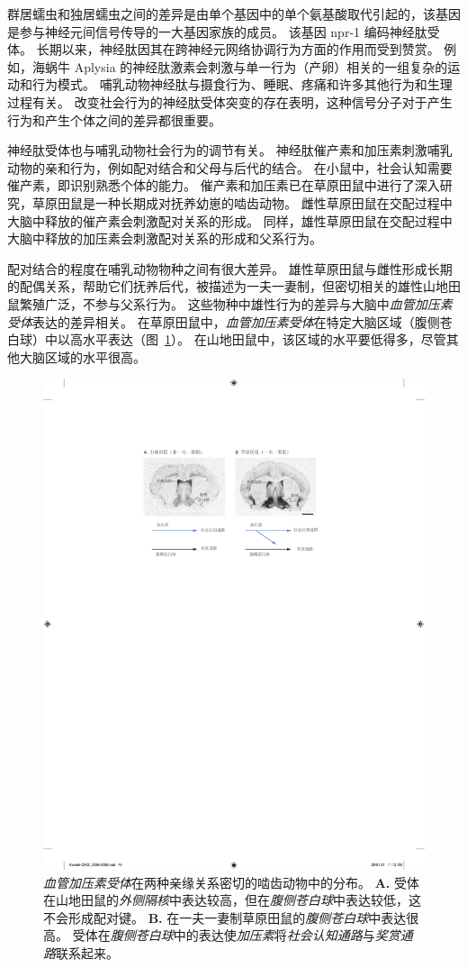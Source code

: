 群居蠕虫和独居蠕虫之间的差异是由单个基因中的单个氨基酸取代引起的，该基因是参与神经元间信号传导的一大基因家族的成员。
该基因 npr-1 编码神经肽受体。
长期以来，神经肽因其在跨神经元网络协调行为方面的作用而受到赞赏。
例如，海蜗牛 Aplysia 的神经肽激素会刺激与单一行为（产卵）相关的一组复杂的运动和行为模式。
哺乳动物神经肽与摄食行为、睡眠、疼痛和许多其他行为和生理过程有关。
改变社会行为的神经肽受体突变的存在表明，这种信号分子对于产生行为和产生个体之间的差异都很重要。


神经肽受体也与哺乳动物社会行为的调节有关。
神经肽催产素和加压素刺激哺乳动物的亲和行为，例如配对结合和父母与后代的结合。
在小鼠中，社会认知需要催产素，即识别熟悉个体的能力。
催产素和加压素已在草原田鼠中进行了深入研究，草原田鼠是一种长期成对抚养幼崽的啮齿动物。
雌性草原田鼠在交配过程中大脑中释放的催产素会刺激配对关系的形成。
同样，雄性草原田鼠在交配过程中大脑中释放的加压素会刺激配对关系的形成和父系行为。


配对结合的程度在哺乳动物物种之间有很大差异。
雄性草原田鼠与雌性形成长期的配偶关系，帮助它们抚养后代，被描述为一夫一妻制，但密切相关的雄性山地田鼠繁殖广泛，不参与父系行为。
这些物种中雄性行为的差异与大脑中\textit{血管加压素受体}表达的差异相关。
在草原田鼠中，\textit{血管加压素受体}在特定大脑区域（腹侧苍白球）中以高水平表达（图~\ref{fig:2_16}）。 
在山地田鼠中，该区域的水平要低得多，尽管其他大脑区域的水平很高。


\begin{figure}[htbp]
	\centering
	\includegraphics[width=0.6\linewidth]{chap02/fig_2_16}
	\caption{\textit{血管加压素受体}在两种亲缘关系密切的啮齿动物中的分布\cite{young2001cellular}。
		\textbf{A.} 受体在山地田鼠的\textit{外侧隔核}中表达较高，但在\textit{腹侧苍白球}中表达较低，这不会形成配对键。
		\textbf{B.} 在一夫一妻制草原田鼠的\textit{腹侧苍白球}中表达很高。
		受体在\textit{腹侧苍白球}中的表达使\textit{加压素}将\textit{社会认知通路}与\textit{奖赏通路}联系起来。}
	\label{fig:2_16}
\end{figure}


